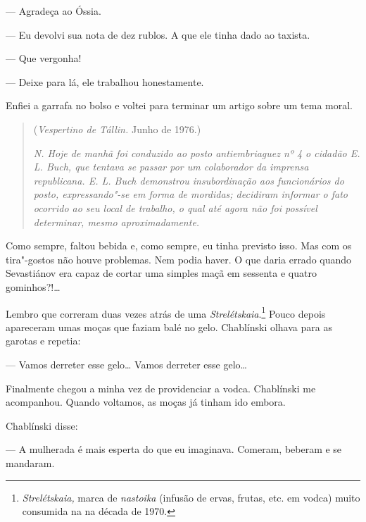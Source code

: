 --- Agradeça ao Óssia.

--- Eu devolvi sua nota de dez rublos. A que ele tinha dado ao taxista.

--- Que vergonha!

--- Deixe para lá, ele trabalhou honestamente.

Enfiei a garrafa no bolso e voltei para terminar um artigo sobre um tema
moral.

\clearpage
\thispagestyle{empty}

\movetooddpage
\begin{center}
{}
\end{center}

\begin{quotation}
\begin{flushright}
(\emph{Vespertino de Tállin.} Junho de 1976.)
\end{flushright}
\vspace{4pt}
\noindent\emph{N. Hoje de manhã foi conduzido ao posto
antiembriaguez nº 4 o cidadão E. L. Buch, que tentava se passar por um
colaborador da imprensa republicana. E. L. Buch demonstrou
insubordinação aos funcionários do posto, expressando"-se em forma de
mordidas; decidiram informar o fato ocorrido ao seu local de trabalho, o
qual até agora não foi possível determinar, mesmo aproximadamente.}
\end{quotation}

Como sempre, faltou bebida e, como sempre, eu tinha previsto isso. Mas
com os tira"-gostos não houve problemas. Nem podia haver. O que daria
errado quando Sevastiánov era capaz de cortar uma simples maçã em
sessenta e quatro gominhos?!\ldots{}

Lembro que correram duas vezes atrás de uma
\emph{Strelétskaia}.\footnote{\emph{Strelétskaia,} marca de
  \emph{nastoika} (infusão de ervas, frutas, etc. em vodca) muito
  consumida na  na década de 1970.} Pouco depois apareceram umas
moças que faziam balé no gelo. Chablínski olhava para as garotas e
repetia:

--- Vamos derreter esse gelo\ldots{} Vamos derreter esse gelo\ldots{}

Finalmente chegou a minha vez de providenciar a vodca. Chablínski me
acompanhou. Quando voltamos, as moças já tinham ido embora.

Chablínski disse:

--- A mulherada é mais esperta do que eu imaginava. Comeram, beberam e
se mandaram.


